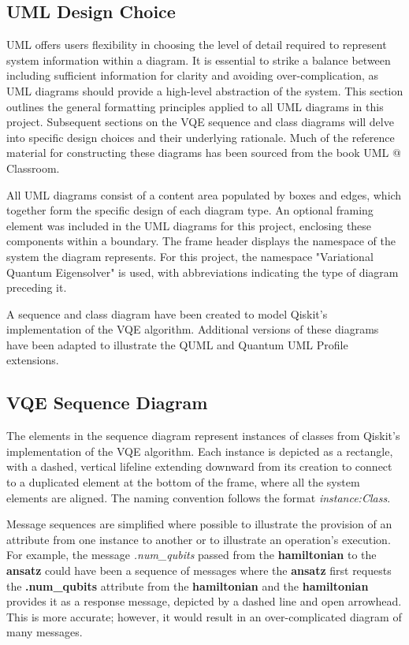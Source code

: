 \documentclass{article}
\begin{document}
\subsection{UML Design Choice}

UML offers users flexibility in choosing the level of detail required to represent system information within a diagram. It is essential to strike a balance between including sufficient information for clarity and avoiding over-complication, as UML diagrams should provide a high-level abstraction of the system. This section outlines the general formatting principles applied to all UML diagrams in this project. Subsequent sections on the VQE sequence and class diagrams will delve into specific design choices and their underlying rationale. Much of the reference material for constructing these diagrams has been sourced from the book UML @ Classroom\cite{Seidl_Scholz_Huemer_Kappel_Duffy_2014}. 

All UML diagrams consist of a content area populated by boxes and edges, which together form the specific design of each diagram type. An optional framing element was included in the UML diagrams for this project, enclosing these components within a boundary. The frame header displays the namespace of the system the diagram represents\cite{UMLElementFrame}. For this project, the namespace "Variational Quantum Eigensolver" is used, with abbreviations indicating the type of diagram preceding it. 

A sequence and class diagram have been created to model Qiskit’s implementation of the VQE algorithm. Additional versions of these diagrams have been adapted to illustrate the QUML and Quantum UML Profile extensions.

\subsection{VQE Sequence Diagram}

The elements in the sequence diagram represent instances of classes from Qiskit’s implementation of the VQE algorithm. Each instance is depicted as a rectangle, with a dashed, vertical lifeline extending downward from its creation to connect to a duplicated element at the bottom of the frame, where all the system elements are aligned. The naming convention follows the format \textit{instance:Class}.

Message sequences are simplified where possible to illustrate the provision of an attribute from one instance to another or to illustrate an operation's execution. For example, the message \textit{.num\_qubits} passed from the \textbf{hamiltonian} to the \textbf{ansatz} could have been a sequence of messages where the \textbf{ansatz} first requests the \textbf{.num\_qubits} attribute from the \textbf{hamiltonian} and the \textbf{hamiltonian} provides it as a response message, depicted by a dashed line and open arrowhead. This is more accurate; however, it would result in an over-complicated diagram of many messages. 
\end{document}
